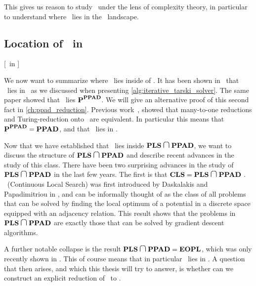 This gives us reason to study \Tarski\ under the lens of complexity theory, in particular to understand where \Tarski\ lies in the \TFNP\ landscape.

\subsection{Location of \Tarski\ in \TFNP}[\Tarski\ in \TFNP]

We now want to summarize where \Tarski\ lies inside of \TFNP. It has been shown in~\cite{etessami_tarskis_2020} that \Tarski\ lies in \PLS\ as we discussed when presenting \cref{alg:iterative_tarski_solver}. The same paper showed that \Tarski\ lies $\textbf{P}^{\textbf{PPAD}}$. We will give an alternative proof of this second fact in \cref{ch:ppad_reduction}. Previous work~, showed that many-to-one reductions and Turing-reduction onto \PPAD\ are equivalent. In particular this means that $\textbf{P}^{\textbf{PPAD}} = \textbf{PPAD}$, and that \Tarski\ lies in \PPAD{}.

Now that we have established that \Tarski\ lies inside $\PLS \medcap \PPAD$, we want to discuss the structure of $\PLS \medcap \PPAD$ and describe recent advances in the study of this class. There have been two surprising advances in the study of $\PLS \medcap \PPAD$ in the last few years. The first is that $\CLS = \PLS \medcap \PPAD$ . \CLS\ (Continuous Local Search) was first introduced by Daskalakis and Papadimitriou in , and can be informally thought of as the class of all problems that can be solved by finding the local optimum of a potential in a discrete space equipped with an adjacency relation. This result shows that the problems in $\PLS \medcap \PPAD$ are exactly those that can be solved by gradient descent algorithms.

A further notable collapse is the result $\PLS \medcap \PPAD = \EOPL$, which was only recently shown in . This of course means that in particular \Tarski\ lies in \EOPL. A question that then arises, and which this thesis will try to answer, is whether can we construct an explicit reduction of \Tarski\ to \EndOfPotentialLine.
